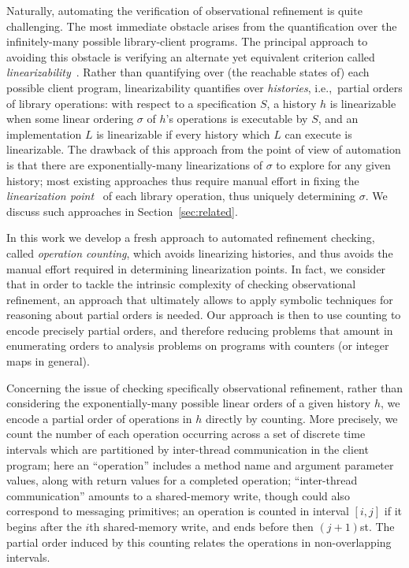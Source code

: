 Naturally, automating the verification of observational refinement is quite
challenging. The most immediate obstacle arises from the quantification over
the infinitely-many possible library-client programs. The principal approach to
avoiding this obstacle is verifying an alternate yet equivalent criterion
called \emph{linearizability}~\citep{journals/toplas/HerlihyW90}. Rather than
quantifying over (the reachable states of) each possible client program,
linearizability quantifies over \emph{histories}, i.e.,~partial orders of
library operations: with respect to a specification $S$, a history $h$ is
linearizable when some linear ordering $\sigma$ of $h$'s operations is
executable by $S$, and an implementation $L$ is linearizable if every history
which $L$ can execute is linearizable. The drawback of this approach from the
point of view of automation is that there are exponentially-many linearizations
of $\sigma$ to explore for any given history; most existing approaches thus
require manual effort in fixing the \emph{linearization point}~\citep{
journals/toplas/HerlihyW90} of each library operation, thus uniquely
determining $\sigma$. 
We discuss such approaches in Section~\ref{sec:related}.

In this work  we develop a fresh approach to automated refinement checking, called \emph{operation counting}, which avoids linearizing histories, and thus avoids the manual effort required in determining linearization points. In fact, we consider that in order to tackle the intrinsic complexity of checking observational refinement, an approach that ultimately allows to apply symbolic techniques for reasoning about partial orders is needed. Our approach is then to use counting to encode precisely partial orders, and therefore reducing problems that amount in enumerating orders to analysis problems on programs with counters (or integer maps in general).

Concerning the issue of checking specifically observational refinement, rather than considering the exponentially-many possible linear orders of a given history $h$, we encode a partial order of operations in $h$ directly by counting. More precisely, we count the number of each operation occurring across a set of discrete time intervals which are partitioned by inter-thread communication in
the client program; here an ``operation'' includes a method name and argument
parameter values, along with return values for a completed operation;
``inter-thread communication'' amounts to a shared-memory write, though could
also correspond to messaging primitives; an operation is counted in interval
$[i,j]$ if it begins after the $i$th shared-memory write, and ends before then
$(j\!+\! 1)$st. The partial order induced by this counting relates the operations in non-overlapping intervals.

